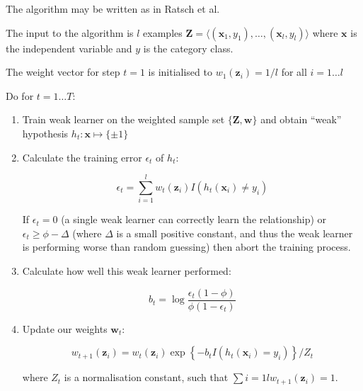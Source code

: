 The algorithm may be written as in Ratsch et al. \cite{Ratsch98}

The input to the algorithm is $l$ examples $\mathbf{Z} = \langle
(\mathbf{x}_1, y_1), \ldots, (\mathbf{x}_l, y_l) \rangle$ where
$\mathbf{x}$ is the independent variable and $y$ is the category
class.

The weight vector for step $t=1$ is initialised to $w_1(\mathbf{z}_i)
= 1/l$ for all $i=1 \ldots l$

Do for $t=1 \ldots T$:


\begin{enumerate}

\item	Train weak learner on the weighted sample set $\{\mathbf{Z},
	\mathbf{w}\}$ and obtain ``weak'' hypothesis $h_t : \mathbf{x}
	\mapsto \{\pm 1\}$

\item	Calculate the training error $\epsilon_t$ of $h_t$:
	
	\begin{equation}
	\epsilon_t = \sum_{i=1}^l w_t (\mathbf{z}_i)
	I \left( h_t(\mathbf{x}_i) \neq y_i\right)
	\end{equation}

	If $\epsilon_t = 0$ (a single weak learner can correctly learn
	the relationship) or $\epsilon_t \geq \phi - \Delta$ (where
	$\Delta$ is a small positive constant, and thus the weak
	learner is performing worse than random guessing) then abort
	the training process.

\item	Calculate how well this weak learner performed:

	\begin{equation}
	b_t = \log \frac{\epsilon_t (1 - \phi)}{\phi(1 - \epsilon_t)}
	\end{equation}

\item	Update our weights $\mathbf{w}_t$:

	\begin{equation}
	w_{t+1}(\mathbf{z}_i) = w_t(\mathbf{z}_i) \exp 
	\left\{ -b_t I \left( h_t(\mathbf{x}_i) = y_i \right) \right\}
	/ Z_t
	\end{equation}

	where $Z_t$ is a normalisation constant, such that
	$\sum{i=1}{l} w_{t+1}(\mathbf{z}_i) = 1$.

\end{enumerate}



